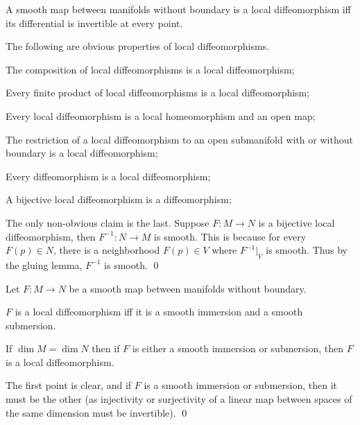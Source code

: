 \eproof

\bcoro

    A smooth map between manifolds without boundary is a local diffeomorphism iff its differential is invertible at every
    point.

\ecoro

The following are obvious properties of local diffeomorphisms.

\bprop

    \benum
        \item The composition of local diffeomorphisms is a local diffeomorphism;
        \item Every finite product of local diffeomorphisms is a local diffeomorphism;
        \item Every local diffeomorphism is a local homeomorphism and an open map;
        \item The restriction of a local diffeomorphism to an open submanifold with or without boundary is a local
        diffeomorphism;
        \item Every diffeomorphism is a local diffeomorphism;
        \item A bijective local diffeomorphism is a diffeomorphism;
    \eenum

\eprop

\bproof

    The only non-obvious claim is the last.
    Suppose $F\colon M\to N$ is a bijective local diffeomorphism, then $F^{-1}\colon N\to M$ is smooth.
    This is because for every $F(p)\in N$, there is a neighborhood $F(p)\in V$ where $F^{-1}|_V$ is smooth.
    Thus by the gluing lemma, $F^{-1}$ is smooth.
    \qed

\eproof

\bprop

    Let $F\colon M\to N$ be a smooth map between manifolds without boundary.
    \benum
        \item $F$ is a local diffeomorphism iff it is a smooth immersion and a smooth submersion.
        \item If $\dim M=\dim N$ then if $F$ is either a smooth immersion or submersion, then $F$ is a local diffeomorphism.
    \eenum

\eprop

\bproof

    The first point is clear, and if $F$ is a smooth immersion or submersion, then it must be the other (as injectivity
    or surjectivity of a linear map between spaces of the same dimension must be invertible).
    \qed

